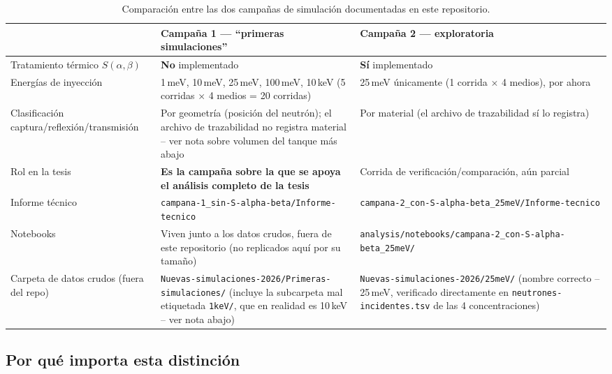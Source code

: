\documentclass[11pt,a4paper]{article}
\newcommand{\codigo}[1]{\nolinkurl{#1}}
\begin{document}
\begin{table}[H]
\centering
\small
\begin{tabularx}{\linewidth}{@{}l X X@{}}
\toprule
 & \textbf{Campaña 1 --- ``primeras simulaciones''} & \textbf{Campaña 2 --- exploratoria} \\
\midrule
Tratamiento térmico $S(\alpha,\beta)$ & \textbf{No} implementado & \textbf{Sí} implementado \\
\addlinespace
Energías de inyección & 1\,meV, 10\,meV, 25\,meV, 100\,meV, 10\,keV (5 corridas $\times$ 4 medios = 20 corridas) & 25\,meV únicamente (1 corrida $\times$ 4 medios), por ahora \\
\addlinespace
Clasificación captura/reflexión/transmisión & Por geometría (posición del neutrón); el archivo de trazabilidad no registra material -- ver nota sobre volumen del tanque más abajo & Por material (el archivo de trazabilidad sí lo registra) \\
\addlinespace
Rol en la tesis & \textbf{Es la campaña sobre la que se apoya el análisis completo de la tesis} & Corrida de verificación/comparación, aún parcial \\
\addlinespace
Informe técnico & \codigo{campana-1\_sin-S-alpha-beta/Informe-tecnico} & \codigo{campana-2\_con-S-alpha-beta\_25meV/Informe-tecnico} \\
\addlinespace
Notebooks & Viven junto a los datos crudos, fuera de este repositorio (no replicados aquí por su tamaño) & \codigo{analysis/notebooks/campana-2\_con-S-alpha-beta\_25meV/} \\
\addlinespace
Carpeta de datos crudos (fuera del repo) & \codigo{Nuevas-simulaciones-2026/Primeras-simulaciones/} (incluye la subcarpeta mal etiquetada \codigo{1keV/}, que en realidad es 10\,keV -- ver nota abajo) & \codigo{Nuevas-simulaciones-2026/25meV/} (nombre correcto -- 25\,meV, verificado directamente en \codigo{neutrones-incidentes.tsv} de las 4 concentraciones) \\
\bottomrule
\end{tabularx}
\caption{Comparación entre las dos campañas de simulación documentadas en este repositorio.}
\label{tab:campanas}
\end{table}

\subsection{Por qué importa esta distinción}
\end{document}
